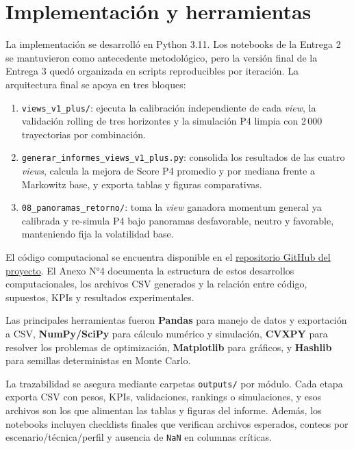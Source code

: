 \section{Implementaci\'on y herramientas}

La implementaci\'on se desarroll\'o en Python 3.11. Los notebooks de la Entrega
2 se mantuvieron como antecedente metodol\'ogico, pero la versi\'on final de la
Entrega 3 qued\'o organizada en scripts reproducibles por iteraci\'on. La
arquitectura final se apoya en tres bloques:

\begin{enumerate}
    \item \texttt{views\_v1\_plus/}: ejecuta la calibraci\'on independiente de
    cada \textit{view}, la validaci\'on rolling de tres horizontes y la
    simulaci\'on P4 limpia con 2\,000 trayectorias por combinaci\'on.

    \item \texttt{generar\_informes\_views\_v1\_plus.py}: consolida los
    resultados de las cuatro \textit{views}, calcula la mejora de Score P4
    promedio y por mediana frente a Markowitz base, y exporta tablas y figuras
    comparativas.

    \item \texttt{08\_panoramas\_retorno/}: toma la \textit{view} ganadora
    momentum general ya calibrada y re-simula P4 bajo panoramas desfavorable,
    neutro y favorable, manteniendo fija la volatilidad base.
\end{enumerate}

El c\'odigo computacional se encuentra disponible en el
\href{https://github.com/Psacevedo/Capstone.git}{repositorio GitHub del proyecto}.
El Anexo N°4 documenta la estructura de estos desarrollos computacionales, los archivos CSV
generados y la relaci\'on entre c\'odigo, supuestos, KPIs y resultados
experimentales.

Las principales herramientas fueron \textbf{Pandas} para manejo de datos y
exportaci\'on a CSV, \textbf{NumPy/SciPy} para c\'alculo num\'erico y
simulaci\'on, \textbf{CVXPY} para resolver los problemas de optimizaci\'on,
\textbf{Matplotlib} para gr\'aficos, y \textbf{Hashlib} para semillas
deterministas en Monte Carlo.

La trazabilidad se asegura mediante carpetas \texttt{outputs/} por m\'odulo.
Cada etapa exporta CSV con pesos, KPIs, validaciones, rankings o simulaciones,
y esos archivos son los que alimentan las tablas y figuras del informe. Adem\'as,
los notebooks incluyen checklists finales que verifican archivos esperados,
conteos por escenario/t\'ecnica/perfil y ausencia de \texttt{NaN} en columnas
cr\'iticas. 

